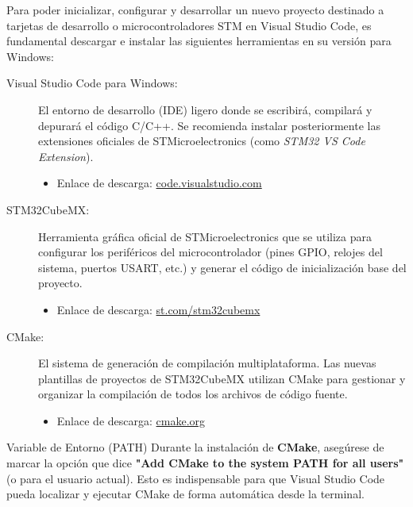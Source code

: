 \documentclass[
10pt, %
a4paper, %
oneside, %
headinclude,footinclude, %
BCOR5mm, %
]{scrartcl}
\begin{document}
Para poder inicializar, configurar y desarrollar un nuevo proyecto destinado a tarjetas de desarrollo o microcontroladores STM en Visual Studio Code, es fundamental descargar e instalar las siguientes herramientas en su versión para Windows:
\begin{description}
	\item[Visual Studio Code para Windows:] El entorno de desarrollo (IDE) ligero donde se escribirá, compilará y depurará el código C/C++. Se recomienda instalar posteriormente las extensiones oficiales de STMicroelectronics (como \textit{STM32 VS Code Extension}).
	\begin{itemize}
		\item Enlace de descarga: \href{https://code.visualstudio.com/}{code.visualstudio.com}
	\end{itemize}
	
	\item[STM32CubeMX:] Herramienta gráfica oficial de STMicroelectronics que se utiliza para configurar los periféricos del microcontrolador (pines GPIO, relojes del sistema, puertos USART, etc.) y generar el código de inicialización base del proyecto.
	\begin{itemize}
		\item Enlace de descarga: \href{https://www.st.com/en/development-tools/stm32cubemx.html}{st.com/stm32cubemx}
	\end{itemize}
	
	\item[CMake:] El sistema de generación de compilación multiplataforma. Las nuevas plantillas de proyectos de STM32CubeMX utilizan CMake para gestionar y organizar la compilación de todos los archivos de código fuente.
	\begin{itemize}
		\item Enlace de descarga: \href{https://cmake.org/download/}{cmake.org}
	\end{itemize}
\end{description}
\begin{InfoBox}{Variable de Entorno (PATH)}
	Durante la instalación de \textbf{CMake}, asegúrese de marcar la opción que dice \textbf{"Add CMake to the system PATH for all users"} (o para el usuario actual). Esto es indispensable para que Visual Studio Code pueda localizar y ejecutar CMake de forma automática desde la terminal.
\end{InfoBox}

\end{document}
